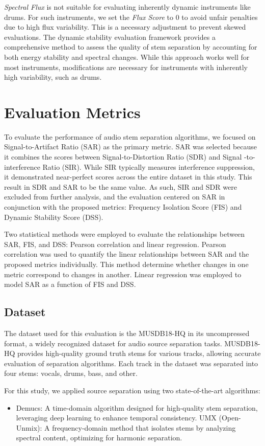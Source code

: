 \documentclass[10pt,twocolumn]{article}
\begin{document}
\textit{Spectral Flux} is not suitable for evaluating inherently dynamic instruments like drums. For such instruments, we set the \textit{Flux Score} to $0$ to avoid unfair penalties due to high flux variability. This is a necessary adjustment to prevent skewed evaluations.
The dynamic stability evaluation framework provides a comprehensive method to assess the quality of stem separation by accounting for both energy stability and spectral changes. While this approach works well for most instruments, modifications are necessary for instruments with inherently high variability, such as drums.

\section{Evaluation Metrics}
To evaluate the performance of audio stem separation algorithms, we focused on Signal-to-Artifact Ratio (SAR) as the primary metric. SAR was selected because it combines the scores between Signal-to-Distortion Ratio (SDR) and Signal -to-interference Ratio (SIR). While SIR typically measures interference suppression, it demonstrated near-perfect scores across the entire dataset in this study. This result in SDR and SAR to be the same value. As such, SIR and SDR were excluded from further analysis, and the evaluation centered on SAR in conjunction with the proposed metrics: Frequency Isolation Score (FIS) and Dynamic Stability Score (DSS).

Two statistical methods were employed to evaluate the relationships between SAR, FIS, and DSS: Pearson correlation and linear regression. Pearson correlation was used to quantify the linear relationships between SAR and the proposed metrics individually. This method determine whether changes in one metric correspond to changes in another. Linear regression was employed to model SAR as a function of FIS and DSS. 

\subsection{Dataset}
The dataset used for this evaluation is the MUSDB18-HQ\cite{musdb18-hq} in its uncompressed format, a widely recognized dataset for audio source separation tasks. MUSDB18-HQ provides high-quality ground truth stems for various tracks, allowing accurate evaluation of separation algorithms. Each track in the dataset was separated into four stems: vocals, drums, bass, and other.

For this study, we applied source separation using two state-of-the-art algorithms:
\begin{itemize}
    \item Demucs: A time-domain algorithm designed for high-quality stem separation, leveraging deep learning to enhance temporal consistency.
    UMX (Open-Unmix): A frequency-domain method that isolates stems by analyzing spectral content, optimizing for harmonic separation.
\end{itemize}  
\end{document}
